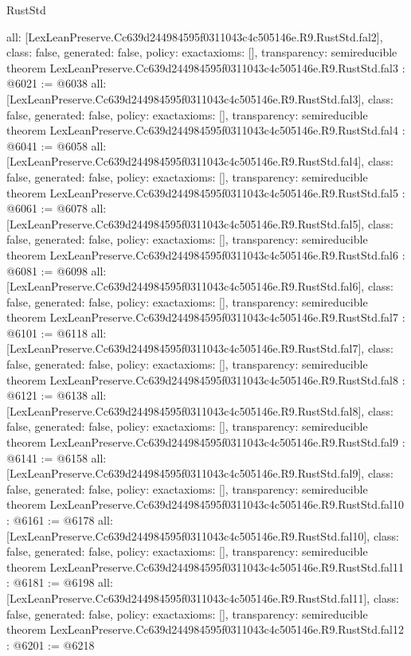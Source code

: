 \begin{lexlean}{RustStd}
\begin{coremodule}
{  all: [LexLeanPreserve.Cc639d244984595f0311043c4c505146e.R9.RustStd.fal2],
  class: false,
  generated: false,
  policy: exact{axioms: []},
  transparency: semireducible
}
theorem LexLeanPreserve.Cc639d244984595f0311043c4c505146e.R9.RustStd.fal3 : @6021 := @6038 {
  all: [LexLeanPreserve.Cc639d244984595f0311043c4c505146e.R9.RustStd.fal3],
  class: false,
  generated: false,
  policy: exact{axioms: []},
  transparency: semireducible
}
theorem LexLeanPreserve.Cc639d244984595f0311043c4c505146e.R9.RustStd.fal4 : @6041 := @6058 {
  all: [LexLeanPreserve.Cc639d244984595f0311043c4c505146e.R9.RustStd.fal4],
  class: false,
  generated: false,
  policy: exact{axioms: []},
  transparency: semireducible
}
theorem LexLeanPreserve.Cc639d244984595f0311043c4c505146e.R9.RustStd.fal5 : @6061 := @6078 {
  all: [LexLeanPreserve.Cc639d244984595f0311043c4c505146e.R9.RustStd.fal5],
  class: false,
  generated: false,
  policy: exact{axioms: []},
  transparency: semireducible
}
theorem LexLeanPreserve.Cc639d244984595f0311043c4c505146e.R9.RustStd.fal6 : @6081 := @6098 {
  all: [LexLeanPreserve.Cc639d244984595f0311043c4c505146e.R9.RustStd.fal6],
  class: false,
  generated: false,
  policy: exact{axioms: []},
  transparency: semireducible
}
theorem LexLeanPreserve.Cc639d244984595f0311043c4c505146e.R9.RustStd.fal7 : @6101 := @6118 {
  all: [LexLeanPreserve.Cc639d244984595f0311043c4c505146e.R9.RustStd.fal7],
  class: false,
  generated: false,
  policy: exact{axioms: []},
  transparency: semireducible
}
theorem LexLeanPreserve.Cc639d244984595f0311043c4c505146e.R9.RustStd.fal8 : @6121 := @6138 {
  all: [LexLeanPreserve.Cc639d244984595f0311043c4c505146e.R9.RustStd.fal8],
  class: false,
  generated: false,
  policy: exact{axioms: []},
  transparency: semireducible
}
theorem LexLeanPreserve.Cc639d244984595f0311043c4c505146e.R9.RustStd.fal9 : @6141 := @6158 {
  all: [LexLeanPreserve.Cc639d244984595f0311043c4c505146e.R9.RustStd.fal9],
  class: false,
  generated: false,
  policy: exact{axioms: []},
  transparency: semireducible
}
theorem LexLeanPreserve.Cc639d244984595f0311043c4c505146e.R9.RustStd.fal10 : @6161 := @6178 {
  all: [LexLeanPreserve.Cc639d244984595f0311043c4c505146e.R9.RustStd.fal10],
  class: false,
  generated: false,
  policy: exact{axioms: []},
  transparency: semireducible
}
theorem LexLeanPreserve.Cc639d244984595f0311043c4c505146e.R9.RustStd.fal11 : @6181 := @6198 {
  all: [LexLeanPreserve.Cc639d244984595f0311043c4c505146e.R9.RustStd.fal11],
  class: false,
  generated: false,
  policy: exact{axioms: []},
  transparency: semireducible
}
theorem LexLeanPreserve.Cc639d244984595f0311043c4c505146e.R9.RustStd.fal12 : @6201 := @6218 {
}
\end{coremodule}
\end{lexlean}
